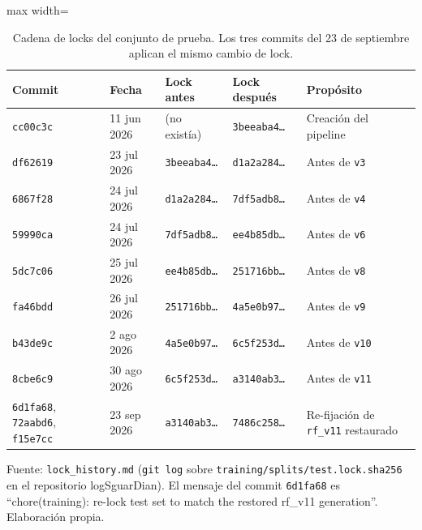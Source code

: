 \begin{table}[htbp]
\centering
\footnotesize
\setlength{\tabcolsep}{3pt}
\begin{adjustbox}{max width=\linewidth}
\begin{tabular}{|l|l|l|l|l|}
\hline
\textbf{Commit} & \textbf{Fecha} & \textbf{Lock antes} & \textbf{Lock después} & \textbf{Propósito} \\ \hline
\texttt{cc00c3c} & 11 jun 2026 & (no existía) & \texttt{3beeaba4\ldots} & Creación del pipeline \\ \hline
\texttt{df62619} & 23 jul 2026 & \texttt{3beeaba4\ldots} & \texttt{d1a2a284\ldots} & Antes de \texttt{v3} \\ \hline
\texttt{6867f28} & 24 jul 2026 & \texttt{d1a2a284\ldots} & \texttt{7df5adb8\ldots} & Antes de \texttt{v4} \\ \hline
\texttt{59990ca} & 24 jul 2026 & \texttt{7df5adb8\ldots} & \texttt{ee4b85db\ldots} & Antes de \texttt{v6} \\ \hline
\texttt{5dc7c06} & 25 jul 2026 & \texttt{ee4b85db\ldots} & \texttt{251716bb\ldots} & Antes de \texttt{v8} \\ \hline
\texttt{fa46bdd} & 26 jul 2026 & \texttt{251716bb\ldots} & \texttt{4a5e0b97\ldots} & Antes de \texttt{v9} \\ \hline
\texttt{b43de9c} & 2 ago 2026 & \texttt{4a5e0b97\ldots} & \texttt{6c5f253d\ldots} & Antes de \texttt{v10} \\ \hline
\texttt{8cbe6c9} & 30 ago 2026 & \texttt{6c5f253d\ldots} & \texttt{a3140ab3\ldots} & Antes de \texttt{v11} \\ \hline
\texttt{6d1fa68}, \texttt{72aabd6}, \texttt{f15e7cc} & 23 sep 2026 & \texttt{a3140ab3\ldots} & \texttt{7486c258\ldots} & Re-fijación de \texttt{rf\_v11} restaurado \\ \hline
\end{tabular}
\end{adjustbox}
\caption{Cadena de locks del conjunto de prueba. Los tres commits del 23 de septiembre aplican el mismo cambio de lock.}
\label{tabla:anexo-locks-cadena}
\par\smallskip\footnotesize Fuente: \texttt{lock\_history.md} (\texttt{git log} sobre \texttt{training/splits/test.lock.sha256} en el repositorio logSguarDian). El mensaje del commit \texttt{6d1fa68} es ``chore(training): re-lock test set to match the restored rf\_v11 generation''. Elaboración propia.
\end{table}

